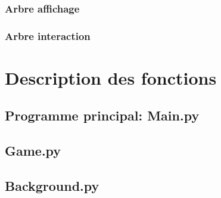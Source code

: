 \documentclass[a4paper]{article}
\begin{document}
            \subsubsection{Arbre affichage}
            \noindent
            \begin{alltt}
            
            \end{alltt}
            \subsubsection{Arbre interaction}
            \noindent
            \begin{alltt}
            
            \end{alltt}
    \section{Description des fonctions}
        \subsection{Programme principal: Main.py}
        \noindent
            \begin{alltt}
            
               
            \end{alltt}

        \subsection{Game.py}
        \noindent
            \begin{alltt}
                
            \end{alltt}

        \subsection{Background.py}
        \noindent
            \begin{alltt}
                 
            \end{alltt}
\end{document}
